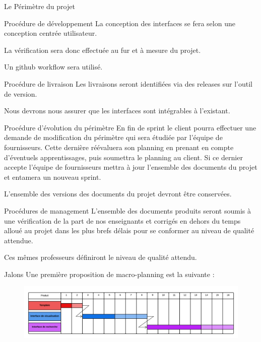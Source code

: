 \documentclass[]{article}
\begin{document}
\begin{section}{Le Périmètre du projet}
\begin{subsection}{Procédure de développement}
            La conception des interfaces se fera selon une conception centrée utilisateur.

            La vérification sera donc effectuée au fur et à mesure du projet.

            Un github workflow sera utilisé.
        \end{subsection}

        \begin{subsection}{Procédure de livraison}
            Les livraisons seront identifiées via des releases sur l’outil de version.

            Nous devrons nous assurer que les interfaces sont intégrables à l’existant.
        \end{subsection}

        \begin{subsection}{Procédure d’évolution du périmètre}
            En fin de sprint le client pourra effectuer une demande de modification du périmètre qui sera étudiée
            par l’équipe de fournisseurs. Cette dernière réévaluera son planning en prenant en compte
            d’éventuels apprentissages, puis soumettra le planning au client. Si ce dernier accepte l’équipe de
            fournisseurs mettra à jour l’ensemble des documents du projet et entamera un nouveau sprint.

            L’ensemble des versions des documents du projet devront être conservées.
        \end{subsection}
    \end{section}

    \begin{section}{Procédures de management}
        L’ensemble des documents produits seront soumis à une vérification de la part de nos enseignants et
        corrigés en dehors du temps alloué au projet dans les plus brefs délais pour se conformer au niveau
        de qualité attendue.

        Ces mêmes professeurs définiront le niveau de qualité attendu.
    \end{section}

    \begin{section}{Jalons}
        Une première proposition de macro-planning est la suivante :

        \begin{figure}[h]
            \begin{center}
                \includegraphics[scale=0.15]{Gantt}
            \end{center}
        \end{figure}
    \end{section}
\end{document}
